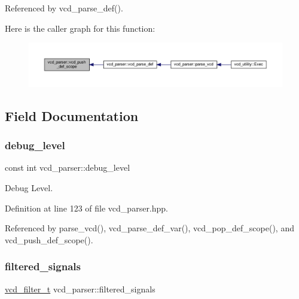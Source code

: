 Referenced by vcd\+\_\+parse\+\_\+def().

Here is the caller graph for this function\+:
\nopagebreak
\begin{figure}[H]
\begin{center}
\leavevmode
\includegraphics[width=350pt]{d2/d25/classvcd__parser_a94636524ca1126b352560c72b646a8cc_icgraph}
\end{center}
\end{figure}


\subsection{Field Documentation}
\mbox{\label{classvcd__parser_a7652385eeffd952c7d74bfabe5c95cc6}} 
\subsubsection{\texorpdfstring{debug\+\_\+level}{debug\_level}}
{\footnotesize\ttfamily const int vcd\+\_\+parser\+::debug\+\_\+level\hspace{0.3cm}{\ttfamily [private]}}



Debug Level. 



Definition at line 123 of file vcd\+\_\+parser.\+hpp.



Referenced by parse\+\_\+vcd(), vcd\+\_\+parse\+\_\+def\+\_\+var(), vcd\+\_\+pop\+\_\+def\+\_\+scope(), and vcd\+\_\+push\+\_\+def\+\_\+scope().

\mbox{\label{classvcd__parser_a4d2f4adb4710f472ba5dcd7c1cdf98a9}} 
\subsubsection{\texorpdfstring{filtered\+\_\+signals}{filtered\_signals}}
{\footnotesize\ttfamily \hyperlink{classvcd__parser_a00f10dd896fdc534014c6192eed18d55}{vcd\+\_\+filter\+\_\+t} vcd\+\_\+parser\+::filtered\+\_\+signals\hspace{0.3cm}{\ttfamily [private]}}



